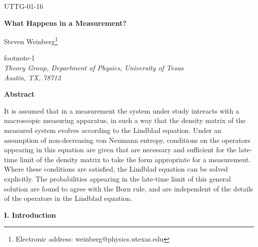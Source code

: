 \documentclass[12pt]{article}
\def\fnote#1#2{\begingroup\def\thefootnote{#1}\footnote{#2}\addtocounter
{footnote}{-1}\endgroup}
\begin{document}
\hfill{UTTG-01-16 }


\vspace{36pt}


\begin{center}
{\large {\bf {What Happens in a Measurement?}}}


\vspace{36pt}
Steven Weinberg\fnote{*}{Electronic address:
weinberg@physics.utexas.edu}\\
{\em Theory Group, Department of Physics, University of
Texas\\
Austin, TX, 78712}


\vspace{30pt}

\noindent
{\bf Abstract}
\end{center}

\vspace{10pt}

\noindent
It is assumed that in a measurement the system  under study interacts with a macroscopic measuring apparatus, in such a way that the density matrix of the measured system  evolves according to the Lindblad equation.  Under an assumption of non-decreasing von Neumann entropy, conditions on the operators appearing in this equation are given that are necessary and sufficient for the late-time limit of the density matrix to take the form appropriate for a measurement. Where these conditions are satisfied, the Lindblad equation can be solved explicitly.  The probabilities appearing in the late-time limit of this general solution are found to agree with the Born rule, and are independent of the details of the operators in the Lindblad equation.


\vfill

\pagebreak



\begin{center}
{\bf I. Introduction}
\end{center}		
\end{document}
